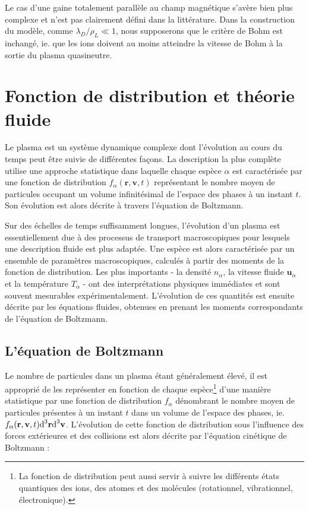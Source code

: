 \begin{refsection}
 Le cas d'une gaine totalement parallèle au champ magnétique s'avère bien plus
 complexe et n'est pas clairement défini dans la littérature. Dans la
 construction du modèle, comme $\lambda_D/\rho_L\ll 1$, nous supposerons que le
 critère de Bohm est inchangé, ie. que les ions doivent au moins atteindre la
 vitesse de Bohm à la sortie du plasma quasineutre.

\section{Fonction de distribution et théorie fluide}
\label{Maxwell-Boltzmann}

Le plasma est un système dynamique complexe dont l'évolution au cours du temps
peut être suivie de différentes façons. La description la plus complète utilise
une approche statistique dans laquelle chaque espèce $\alpha$ est caractérisée
par une fonction de distribution $f_\alpha(\mathbf{r},\mathbf{v},t)$
représentant le nombre moyen de particules occupant un volume infinitésimal
de l'espace des phases à un instant $t$. Son évolution est alors décrite à
travers l'équation de Boltzmann.

Sur des échelles de temps suffisamment longues, l'évolution d'un plasma est 
essentiellement due à des processus de transport macroscopiques pour lesquels
une description fluide est plus adaptée. Une espèce est alors
caractérisée par un ensemble de paramètres macroscopiques, calculés à
partir des moments de la fonction de distribution. Les plus importants -
la densité $n_\alpha$, la vitesse fluide $\mathbf u_\alpha$ et la température
$T_\alpha$ - ont des interprétations physiques immédiates et sont souvent mesurables
expérimentalement. L'évolution de ces quantités est ensuite décrite par les
équations fluides, obtenues en prenant les moments correspondants de l'équation de Boltzmann.

\subsection{L'équation de Boltzmann}
Le nombre de particules dans un plasma étant généralement élevé, il est
approprié de les représenter en fonction de chaque
espèce\footnote{La fonction de
distribution peut aussi servir à suivre les différents états quantiques des
ions, des atomes et des molécules (rotationnel, vibrationnel, électronique).}
d'une manière statistique par une fonction de
distribution $f_\alpha$ dénombrant le nombre moyen de particules présentes à un
instant $t$ dans un volume de l'espace des phases, ie. $f_\alpha(\mathbf
r,\mathbf v,t)\text{d}^{{3}}\mathbf r\text{d}^{{3}}\mathbf v$.
L'évolution de cette fonction de distribution sous l'influence des forces
extérieures et des collisions est alors décrite par l'équation cinétique de
Boltzmann :


\end{refsection}
